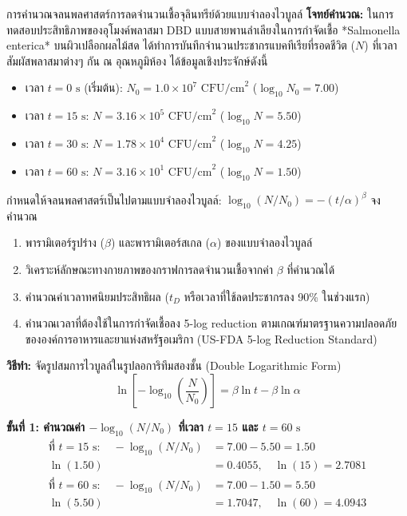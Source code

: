 \begin{examplebox}{การคำนวณจลนพลศาสตร์การลดจำนวนเชื้อจุลินทรีย์ด้วยแบบจำลองไวบูลล์}
\textbf{โจทย์คำนวณ:} ในการทดสอบประสิทธิภาพของอุโมงค์พลาสมา DBD แบบสายพานลำเลียงในการกำจัดเชื้อ *Salmonella enterica* บนผิวเปลือกผลไม้สด ได้ทำการบันทึกจำนวนประชากรแบคทีเรียที่รอดชีวิต ($N$) ที่เวลาสัมผัสพลาสมาต่างๆ กัน ณ อุณหภูมิห้อง ได้ข้อมูลเชิงประจักษ์ดังนี้
\begin{itemize}
    \item เวลา $t = 0 \text{ s}$ (เริ่มต้น): $N_0 = 1.0 \times 10^7 \text{ CFU/cm}^2$ ($\log_{10} N_0 = 7.00$)
    \item เวลา $t = 15 \text{ s}$: $N = 3.16 \times 10^5 \text{ CFU/cm}^2$ ($\log_{10} N = 5.50$)
    \item เวลา $t = 30 \text{ s}$: $N = 1.78 \times 10^4 \text{ CFU/cm}^2$ ($\log_{10} N = 4.25$)
    \item เวลา $t = 60 \text{ s}$: $N = 3.16 \times 10^1 \text{ CFU/cm}^2$ ($\log_{10} N = 1.50$)
\end{itemize}
กำหนดให้จลนพลศาสตร์เป็นไปตามแบบจำลองไวบูลล์: $\log_{10}(N/N_0) = -(t/\alpha)^\beta$ จงคำนวณ
\begin{enumerate}
    \item พารามิเตอร์รูปร่าง ($\beta$) และพารามิเตอร์สเกล ($\alpha$) ของแบบจำลองไวบูลล์
    \item วิเคราะห์ลักษณะทางกายภาพของกราฟการลดจำนวนเชื้อจากค่า $\beta$ ที่คำนวณได้
    \item คำนวณค่าเวลาทศนิยมประสิทธิผล ($t_D$ หรือเวลาที่ใช้ลดประชากรลง 90\% ในช่วงแรก)
    \item คำนวณเวลาที่ต้องใช้ในการกำจัดเชื้อลง 5-log reduction ตามเกณฑ์มาตรฐานความปลอดภัยขององค์การอาหารและยาแห่งสหรัฐอเมริกา (US-FDA 5-log Reduction Standard)
\end{enumerate}

\vspace{6pt}
\textbf{วิธีทำ:}
จัดรูปสมการไวบูลล์ในรูปลอการิทึมสองชั้น (Double Logarithmic Form)
\begin{equation*}
    \ln \left[ - \log_{10} \left( \frac{N}{N_0} \right) \right] = \beta \ln t - \beta \ln \alpha
\end{equation*}

\textbf{ขั้นที่ 1: คำนวณค่า $-\log_{10}(N/N_0)$ ที่เวลา $t = 15$ และ $t = 60 \text{ s}$}
\begin{align*}
    \text{ที่ } t = 15 \text{ s}: \quad -\log_{10}(N/N_0) &= 7.00 - 5.50 = 1.50 \\
    \ln(1.50) &= 0.4055, \quad \ln(15) = 2.7081 \\
    \text{ที่ } t = 60 \text{ s}: \quad -\log_{10}(N/N_0) &= 7.00 - 1.50 = 5.50 \\
    \ln(5.50) &= 1.7047, \quad \ln(60) = 4.0943
\end{align*}


\end{examplebox}
